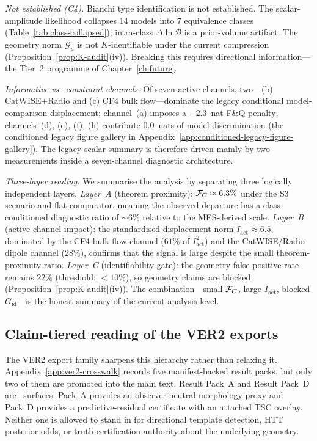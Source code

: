 \emph{Not established (C4).}\quad
Bianchi type identification is not established.  The
scalar-amplitude likelihood collapses 14 models into 7
equivalence classes
(Table~\ref{tab:class-collapsed}); intra-class
$\Delta\ln\mathcal{B}$ is a prior-volume artifact.  The
geometry norm $\mathcal{G}_u$ is not $K$-identifiable under the
current compression (Proposition~\ref{prop:K-audit}(iv)).
Breaking this requires directional information---the Tier~2
programme of Chapter~\ref{ch:future}.

\emph{Informative vs.\ constraint channels.}\quad
Of seven active channels, two---(b) CatWISE+Radio and (c) CF4
bulk flow---dominate the legacy conditional model-comparison
displacement; channel~(a)
imposes a $-2.3$~nat F\&Q penalty; channels~(d), (e), (f),
(h) contribute $0.0$~nats of model discrimination
(the conditioned legacy figure gallery in Appendix~\ref{app:conditioned-legacy-figure-gallery}).  The legacy scalar summary is
therefore driven mainly by two measurements inside a seven-channel
diagnostic architecture.

\emph{Three-layer reading.}\quad
We summarise the analysis by separating three logically
independent layers.
\emph{Layer~A} (theorem proximity):
$\mathcal{F}_C \approx 6.3\%$ under the S3 scenario and flat comparator,
meaning the observed departure has a class-conditioned diagnostic
ratio of $\sim\!6\%$ relative to the MES-derived scale.
\emph{Layer~B} (active-channel impact):
the standardised displacement norm $I_{\mathrm{act}} \approx 6.5$,
dominated by the CF4 bulk-flow channel ($61\%$ of $I_{\mathrm{act}}^2$)
and the CatWISE/Radio dipole channel ($28\%$), confirms that the
signal is large despite the small theorem-proximity ratio.
\emph{Layer~C} (identifiability gate):
the geometry false-positive rate remains $22\%$ (threshold: $<10\%$),
so geometry claims are blocked
(Proposition~\ref{prop:K-audit}(iv)).
The combination---small $\mathcal{F}_C$, large $I_{\mathrm{act}}$,
blocked $G_{\mathrm{id}}$---is the honest summary of the
current analysis level.


\subsection{Claim-tiered reading of the VER2 exports}
\label{sec:disc-ver2-claimtiers}

The VER2 export family sharpens this hierarchy rather than relaxing it.
Appendix~\ref{app:ver2-crosswalk} records five manifest-backed result
packs, but only two of them are promoted into the main text.
Result Pack~A and Result Pack~D are \ConditionalStatus\ surfaces:
Pack~A provides an observer-neutral morphology proxy and Pack~D provides
a predictive-residual certificate with an attached TSC overlay.
Neither one is allowed to stand in for directional template detection,
HTT posterior odds, or truth-certification authority about the underlying
geometry.

